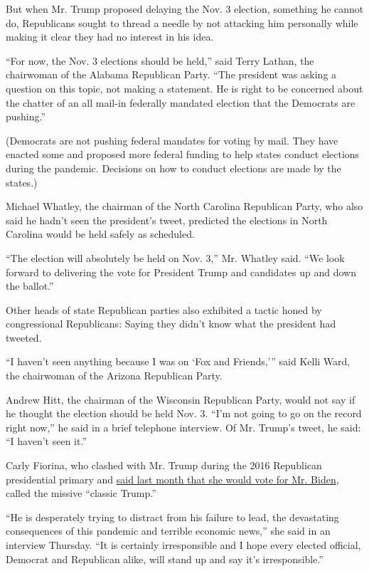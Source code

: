But when Mr. Trump proposed delaying the Nov. 3 election, something he
cannot do, Republicans sought to thread a needle by not attacking him
personally while making it clear they had no interest in his idea.

``For now, the Nov. 3 elections should be held,'' said Terry Lathan, the
chairwoman of the Alabama Republican Party. ``The president was asking a
question on this topic, not making a statement. He is right to be
concerned about the chatter of an all mail-in federally mandated
election that the Democrats are pushing.''

(Democrats are not pushing federal mandates for voting by mail. They
have enacted some and proposed more federal funding to help states
conduct elections during the pandemic. Decisions on how to conduct
elections are made by the states.)

Michael Whatley, the chairman of the North Carolina Republican Party,
who also said he hadn't seen the president's tweet, predicted the
elections in North Carolina would be held safely as scheduled.

``The election will absolutely be held on Nov. 3,'' Mr. Whatley said.
``We look forward to delivering the vote for President Trump and
candidates up and down the ballot.''

Other heads of state Republican parties also exhibited a tactic honed by
congressional Republicans: Saying they didn't know what the president
had tweeted.

``I haven't seen anything because I was on `Fox and Friends,''' said
Kelli Ward, the chairwoman of the Arizona Republican Party.

Andrew Hitt, the chairman of the Wisconsin Republican Party, would not
say if he thought the election should be held Nov. 3. ``I'm not going to
go on the record right now,'' he said in a brief telephone interview. Of
Mr. Trump's tweet, he said: ``I haven't seen it.''

Carly Fiorina, who clashed with Mr. Trump during the 2016 Republican
presidential primary and
\href{https://www.theatlantic.com/politics/archive/2020/06/carly-fiorina-vote-biden/613474/}{said
last month that she would vote for Mr. Biden}, called the missive
``classic Trump.''

``He is desperately trying to distract from his failure to lead, the
devastating consequences of this pandemic and terrible economic news,''
she said in an interview Thursday. ``It is certainly irresponsible and I
hope every elected official, Democrat and Republican alike, will stand
up and say it's irresponsible.''


